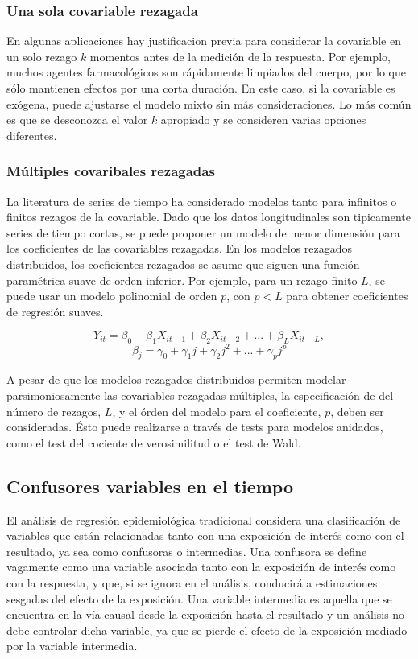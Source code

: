 \documentclass[12pt]{article}
\begin{document}
\subsubsection{Una sola covariable rezagada}

En algunas aplicaciones hay justificacion previa para considerar la covariable en un solo rezago $k$ momentos antes de la
medición de la respuesta. Por ejemplo, muchos agentes farmacológicos son rápidamente limpiados del cuerpo, por lo que sólo
mantienen efectos por una corta duración. En este caso, si la covariable es exógena, puede ajustarse el modelo mixto sin más
consideraciones. Lo más común es que se desconozca el valor $k$ apropiado y se consideren varias opciones diferentes.

\subsubsection{Múltiples covaribales rezagadas}

La literatura de series de tiempo ha considerado modelos tanto para infinitos o finitos rezagos de la covariable. Dado que
los datos longitudinales son tipicamente series de tiempo cortas, se puede proponer un modelo de menor dimensión para los
coeficientes de las covariables rezagadas. En los modelos rezagados distribuidos, los coeficientes rezagados se asume
que siguen una función paramétrica suave de orden inferior. Por ejemplo, para un rezago finito $L$, se puede usar un
modelo polinomial de orden $p$, con $p < L$ para obtener coeficientes de regresión suaves.

\[ Y_{it} = \beta_0 + \beta_1 X_{it-1} + \beta_2 X_{it-2} + ... + \beta_L X_{it-L}, \]
\[ \beta_j = \gamma_0 + \gamma_1 j + \gamma_2 j^2 + ... + \gamma_p j^p \]

A pesar de que los modelos rezagados distribuidos permiten modelar parsimoniosamente las covariables rezagadas múltiples,
la especificación de del número de rezagos, $L$, y el órden del modelo para el coeficiente, $p$, deben ser consideradas.
Ésto puede realizarse a través de tests para modelos anidados, como el test del cociente de verosimilitud o el test de Wald.

\subsection{Confusores variables en el tiempo}

El análisis de regresión epidemiológica tradicional considera una clasificación de variables que están relacionadas tanto
con una exposición de interés como con el resultado, ya sea como confusoras o intermedias. Una confusora se define
vagamente como una variable asociada tanto con la exposición de interés como con la respuesta, y que, si se ignora en
el análisis, conducirá a estimaciones sesgadas del efecto de la exposición. Una variable intermedia es aquella que se
encuentra en la vía causal desde la exposición hasta el resultado y un análisis no debe controlar
dicha variable, ya que se pierde el efecto de la exposición mediado por la variable intermedia.
\end{document}

